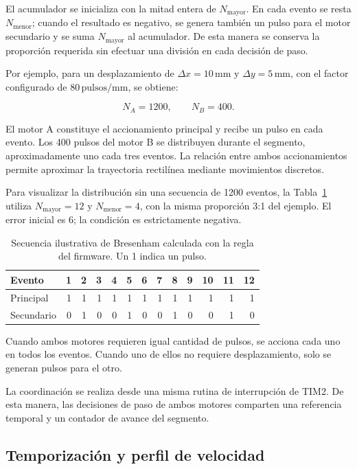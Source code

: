 \documentclass[blue,fullpaper]{ludusofficial}  %
\begin{document}
El acumulador se inicializa con la mitad entera
de $N_{\mathrm{mayor}}$. En cada evento se resta
$N_{\mathrm{menor}}$; cuando el resultado es negativo,
se genera también un pulso para el motor secundario
y se suma $N_{\mathrm{mayor}}$ al acumulador.
De esta manera se conserva la proporción requerida
sin efectuar una división en cada decisión de paso.

Por ejemplo, para un desplazamiento de
$\Delta x = 10\,\mathrm{mm}$ y
$\Delta y = 5\,\mathrm{mm}$, con el factor
configurado de $80\,\mathrm{pulsos/mm}$, se obtiene:

\begin{equation}
    N_A = 1200,
    \qquad
    N_B = 400.
\end{equation}

El motor A constituye el accionamiento principal
y recibe un pulso en cada evento. Los 400 pulsos
del motor B se distribuyen durante el segmento,
aproximadamente uno cada tres eventos.
La relación entre ambos accionamientos permite
aproximar la trayectoria rectilínea mediante
movimientos discretos.

Para visualizar la distribución sin una secuencia de 1200 eventos, la Tabla~\ref{tab:bresenham-ejemplo} utiliza $N_{\mathrm{mayor}}=12$ y $N_{\mathrm{menor}}=4$, con la misma proporción 3:1 del ejemplo. El error inicial es 6; la condición es estrictamente negativa.

\begin{table}[htbp]
\centering\small
\caption{Secuencia ilustrativa de Bresenham calculada con la regla del firmware. Un 1 indica un pulso.}
\label{tab:bresenham-ejemplo}
\begin{tabular}{lrrrrrrrrrrrr}
\hline Evento &1&2&3&4&5&6&7&8&9&10&11&12\\
\hline Principal &1&1&1&1&1&1&1&1&1&1&1&1\\
Secundario &0&1&0&0&1&0&0&1&0&0&1&0\\
\hline
\end{tabular}
\end{table}

Cuando ambos motores requieren igual cantidad
de pulsos, se acciona cada uno en todos los eventos.
Cuando uno de ellos no requiere desplazamiento,
solo se generan pulsos para el otro.

La coordinación se realiza desde una misma rutina
de interrupción de TIM2. De esta manera,
las decisiones de paso de ambos motores comparten
una referencia temporal y un contador de avance
del segmento.

\subsection{Temporización y perfil de velocidad}
\end{document}
